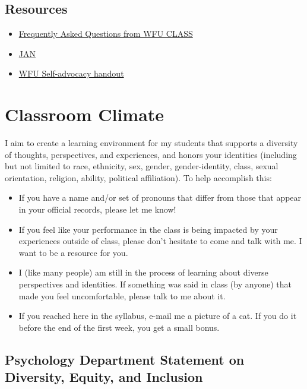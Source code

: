 \documentclass[
]{book}
\providecommand{\tightlist}{%
  \setlength{\itemsep}{0pt}\setlength{\parskip}{0pt}}
\begin{document}
\hypertarget{resources}{%
\section{Resources}\label{resources}}

\begin{itemize}
\tightlist
\item
  \href{https://class.wfu.edu/frequently-asked-questions-about-lac-ds/}{Frequently Asked Questions from WFU CLASS}
\item
  \href{https://askjan.org/}{JAN}
\item
  \href{https://docs.google.com/document/d/1X44zJyTz8-s9t6IXw0bII2DCFiOk1NR2MRfTi8wBiIc/}{WFU Self-advocacy handout}
\end{itemize}

\hypertarget{classroom-climate}{%
\chapter{Classroom Climate}\label{classroom-climate}}

I aim to create a learning environment for my students that supports a diversity of thoughts, perspectives, and experiences, and honors your identities (including but not limited to race, ethnicity, sex, gender, gender-identity, class, sexual orientation, religion, ability, political affiliation). To help accomplish this:

\begin{itemize}
\item
  If you have a name and/or set of pronouns that differ from those that appear in your official records, please let me know!
\item
  If you feel like your performance in the class is being impacted by your experiences outside of class, please don't hesitate to come and talk with me. I want to be a resource for you.
\item
  I (like many people) am still in the process of learning about diverse perspectives and identities. If something was said in class (by anyone) that made you feel uncomfortable, please talk to me about it.
\item
  If you reached here in the syllabus, e-mail me a picture of a cat. If you do it before the end of the first week, you get a small bonus.
\end{itemize}

\hypertarget{psychology-department-statement-on-diversity-equity-and-inclusion}{%
\section{Psychology Department Statement on Diversity, Equity, and Inclusion}\label{psychology-department-statement-on-diversity-equity-and-inclusion}}
\end{document}
